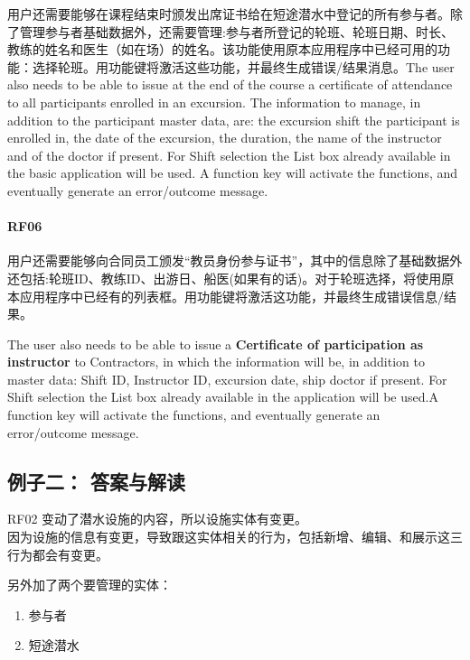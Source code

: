用户还需要能够在课程结束时颁发出席证书给在短途潜水中登记的所有参与者。除了管理参与者基础数据外，还需要管理:参与者所登记的轮班、轮班日期、时长、教练的姓名和医生（如在场）的姓名。该功能使用原本应用程序中已经可用的功能：选择轮班。用功能键将激活这些功能，并最终生成错误/结果消息。The
user also needs to be able to issue at the end of the course a
certificate of attendance to all participants enrolled in an excursion.
The information to manage, in addition to the participant master data,
are: the excursion shift the participant is enrolled in, the date of the
excursion, the duration, the name of the instructor and of the doctor if
present. For Shift selection the List box already available in the basic
application will be used. A function key will activate the functions,
and eventually generate an error/outcome message.

\hypertarget{rf06}{%
\paragraph{RF06}\label{rf06}}

用户还需要能够向合同员工颁发``教员身份参与证书''，其中的信息除了基础数据外还包括:轮班ID、教练ID、出游日、船医(如果有的话)。对于轮班选择，将使用原本应用程序中已经有的列表框。用功能键将激活这功能，并最终生成错误信息/结果。

The user also needs to be able to issue a \textbf{Certificate of
participation as instructor} to Contractors, in which the information
will be, in addition to master data: Shift ID, Instructor ID, excursion
date, ship doctor if present. For Shift selection the List box already
available in the application will be used.A function key will activate
the functions, and eventually generate an error/outcome message.

\hypertarget{ux4f8bux5b50ux4e8c-ux7b54ux6848ux4e0eux89e3ux8bfb}{%
\subsection{例子二：
答案与解读}\label{ux4f8bux5b50ux4e8c-ux7b54ux6848ux4e0eux89e3ux8bfb}}

RF02 变动了潜水设施的内容，所以设施实体有变更。\\
因为设施的信息有变更，导致跟这实体相关的行为，包括新增、编辑、和展示这三行为都会有变更。

另外加了两个要管理的实体：

\begin{enumerate}
\tightlist
\item
  参与者
\item
  短途潜水
\end{enumerate}

